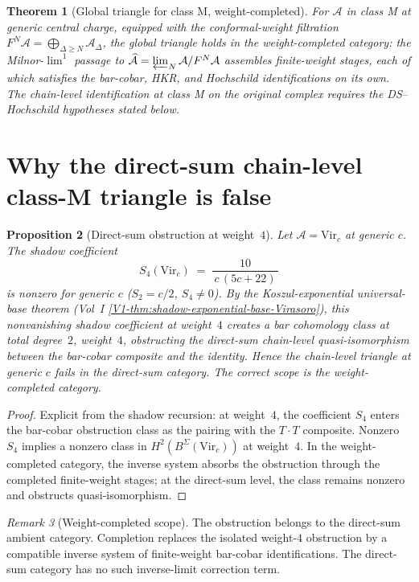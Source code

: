 \documentclass[11pt]{amsart}
\newtheorem{theorem}{Theorem}[section]
\newtheorem{proposition}[theorem]{Proposition}
\theoremstyle{definition}
\theoremstyle{remark}
\newtheorem{remark}[theorem]{Remark}
\providecommand{\cA}{\mathcal{A}}
\begin{document}
\begin{theorem}[Global triangle for class M, weight-completed]%
\label{thm:triangle-classM-completed}%
For $\cA$ in class M at generic central charge, equipped with the
conformal-weight filtration
$F^N\cA = \bigoplus_{\Delta \ge N}\cA_\Delta$, the global triangle
holds in the weight-completed category: the Milnor-$\lim^1$ passage to
$\widehat{\cA} = \varprojlim_N \cA/F^N\cA$ assembles finite-weight
stages, each of which satisfies the bar-cobar, HKR, and Hochschild
identifications on its own. The chain-level identification at class M
on the original complex requires the DS--Hochschild hypotheses stated
below.
\end{theorem}

\section{Why the direct-sum chain-level class-M triangle is false}
\label{sec:direct-sum-classM-false}

\begin{proposition}[Direct-sum obstruction at weight~$4$]%
\label{prop:direct-sum-obstruction}%
Let $\cA = \mathrm{Vir}_c$ at generic $c$. The shadow coefficient
\[
  S_4(\mathrm{Vir}_c) \;=\;
  \frac{10}{\,c\,(5c + 22)\,}
\]
is nonzero for generic $c$ ($S_2 = c/2$, $S_4 \ne 0$). By
the Koszul-exponential universal-base theorem (Vol~I
\ref*{V1-thm:shadow-exponential-base-Virasoro}), this nonvanishing
shadow coefficient at weight~$4$ creates a bar cohomology class
at total degree~$2$, weight~$4$, obstructing the direct-sum
chain-level quasi-isomorphism between the bar-cobar composite
and the identity. Hence the chain-level triangle at generic $c$
fails in the direct-sum category. The correct scope is the
weight-completed category.
\end{proposition}

\begin{proof}
Explicit from the shadow recursion: at weight~$4$, the coefficient
$S_4$ enters the bar-cobar obstruction class as the pairing with the
$T \cdot T$ composite. Nonzero $S_4$ implies a nonzero class in
$H^2(B^\Sigma(\mathrm{Vir}_c))$ at weight~$4$. In the
weight-completed category, the inverse system absorbs the obstruction
through the completed finite-weight stages; at the direct-sum level,
the class remains nonzero and obstructs quasi-isomorphism.
\end{proof}

\begin{remark}[Weight-completed scope]%
\label{rem:direct-sum-scope-tag}%
The obstruction belongs to the direct-sum ambient category.
Completion replaces the isolated
weight-$4$ obstruction by a compatible inverse system of finite-weight
bar-cobar identifications. The direct-sum category has no such
inverse-limit correction term.
\end{remark}
\end{document}
